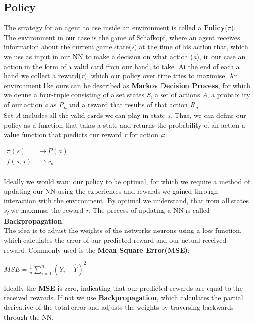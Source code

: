 \subsection{Policy}
The strategy for an agent to use inside an environment is called a \textbf{Policy}($\pi$).\\
The environment in our case is the game of Schafkopf, where an agent receives information about the current game
state(\textit{s}) at the time of his action that, which we use as input in our NN to make a decision on what action
(\textit{a}), in our case an action in the form of a valid card from our hand, to take.
At the end of each a hand we collect a reward(\textit{r}), which our policy over time tries to maximise.
\newline
An environment like ours can be described as \textbf{Markov Decision Process}, for which we define a four-tuple
consisting of a set states \textit{S}, a set of actions \textit{A}, a probability of our action \textit{a} as
\textit{P\textsubscript{a}} and a reward that results of that action \textit{R\textsubscript{a}}.\\
Set \textit{A} includes all the valid cards we can play in state \textit{s}.
Thus, we can define our policy as a function that takes a state and returns the probability of an action a value
function that predicts our reward \textit{r} for action \textit{a}:
\begin{center}
    \begin{math}
        \boxed{
            \begin{aligned}
                \pi(s)&\rightarrow P(a)\\
                f(s,a)&\rightarrow r_{a}\\
            \end{aligned}}
    \end{math}
\end{center}
Ideally we would want our policy to be optimal, for which we require a method of updating our NN using the
experiences and rewards we gained through interaction with the environment.
By optimal we understand, that from all states \textit{s\textsubscript{i}} we maximise the reward \textit{r}.
\newline
The process of updating a NN is called \textbf{Backpropagation}.\\
The idea is to adjust the weights of the networks neurons using a loss function, which calculates the error of our
predicted reward and our actual received reward.
Commonly used is the \textbf{Mean Square Error(MSE)}:
\begin{center}
    \begin{math}
        \boxed{
            MSE = \frac{1}{n} \sum_{i=1}^n(Y_{i}-\hat Y)^2
        }
    \end{math}
\end{center}
Ideally the \textbf{MSE} is zero, indicating that our predicted rewards are equal to the received rewards.
If not we use \textbf{Backpropagation}, which calculates the partial derivative of the total error and adjusts the
weights by traversing backwards through the NN.


